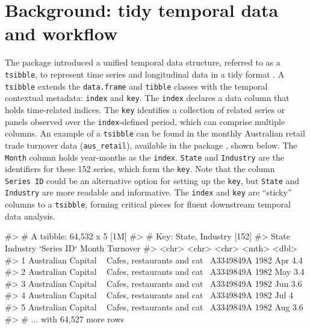 \hypertarget{background-tidy-temporal-data-and-workflow}{%
\section{Background: tidy temporal data and
workflow}\label{background-tidy-temporal-data-and-workflow}}

The  package \citep{wang2020tsibble} introduced a
unified temporal data structure, referred to as a \texttt{tsibble}, to
represent time series and longitudinal data in a tidy format
\citep{wickham2014tidy}. A \texttt{tsibble} extends the
\texttt{data.frame} and \texttt{tibble} classes with the temporal
contextual metadata: \texttt{index} and \texttt{key}. The \texttt{index}
declares a data column that holds time-related indices. The \texttt{key}
identifies a collection of related series or panels observed over the
\texttt{index}-defined period, which can comprise multiple columns. An
example of a \texttt{tsibble} can be found in the monthly Australian
retail trade turnover data (\texttt{aus\_retail}), available in the
 package \citep{R-tsibbledata}, shown below. The
\texttt{Month} column holds year-months as the \texttt{index}.
\texttt{State} and \texttt{Industry} are the identifiers for these 152
series, which form the \texttt{key}. Note that the column
\texttt{Series\ ID} could be an alternative option for setting up the
\texttt{key}, but \texttt{State} and \texttt{Industry} are more readable
and informative. The \texttt{index} and \texttt{key} are ``sticky''
columns to a \texttt{tsibble}, forming critical pieces for fluent
downstream temporal data analysis.

\begin{Schunk}
\begin{Soutput}
#> # A tsibble: 64,532 x 5 [1M]
#> # Key:       State, Industry [152]
#>   State                Industry                    `Series ID`    Month Turnover
#>   <chr>                <chr>                       <chr>          <mth>    <dbl>
#> 1 Australian Capital ~ Cafes, restaurants and cat~ A3349849A   1982 Apr      4.4
#> 2 Australian Capital ~ Cafes, restaurants and cat~ A3349849A   1982 May      3.4
#> 3 Australian Capital ~ Cafes, restaurants and cat~ A3349849A   1982 Jun      3.6
#> 4 Australian Capital ~ Cafes, restaurants and cat~ A3349849A   1982 Jul      4  
#> 5 Australian Capital ~ Cafes, restaurants and cat~ A3349849A   1982 Aug      3.6
#> # ... with 64,527 more rows
\end{Soutput}
\end{Schunk}

